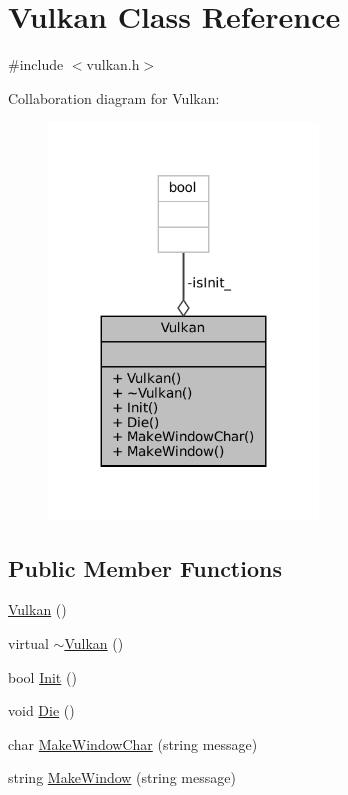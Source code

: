 \hypertarget{classVulkan}{}\section{Vulkan Class Reference}
\label{classVulkan}


{\ttfamily \#include $<$vulkan.\+h$>$}



Collaboration diagram for Vulkan\+:\nopagebreak
\begin{figure}[H]
\begin{center}
\leavevmode
\includegraphics[width=203pt]{classVulkan__coll__graph}
\end{center}
\end{figure}
\subsection*{Public Member Functions}
\begin{DoxyCompactItemize}
\item 
\mbox{\hyperlink{classVulkan_a69c8a0222ecd2f24887acc75a7ffd922}{Vulkan}} ()
\item 
virtual \mbox{\hyperlink{classVulkan_a85f20d6cd141ec9568d812cfdf81971f}{$\sim$\+Vulkan}} ()
\item 
bool \mbox{\hyperlink{classVulkan_a308c68e03405bc740435a2af62cc7434}{Init}} ()
\item 
void \mbox{\hyperlink{classVulkan_a728e47da1e42d65c6d9efa5106f6d13b}{Die}} ()
\item 
char \mbox{\hyperlink{classVulkan_a70565678cd6771ac57706ff8586e256f}{Make\+Window\+Char}} (string message)
\item 
string \mbox{\hyperlink{classVulkan_a46c4ec53f8960a1fa3f3eb63d7755654}{Make\+Window}} (string message)
\end{DoxyCompactItemize}
